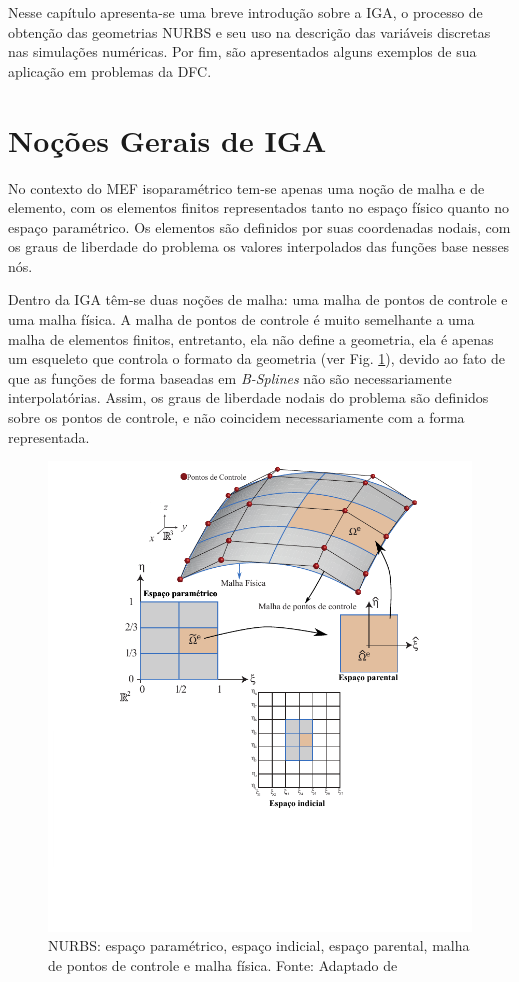 \documentclass[tese_patricia]{subfiles}
\begin{document}
Nesse capítulo apresenta-se uma breve introdução sobre a IGA, o processo de obtenção das geometrias NURBS e seu uso na descrição das variáveis discretas nas simulações numéricas. Por fim, são apresentados alguns exemplos de sua aplicação em problemas da DFC.

\vspace{-0.1cm}

\section{Noções Gerais de IGA}

No contexto do MEF isoparamétrico tem-se apenas uma noção de malha e de elemento, com os elementos finitos representados tanto no espaço físico quanto no espaço paramétrico. Os elementos são definidos por suas coordenadas nodais, com os graus de liberdade do problema os valores interpolados das funções base nesses nós.

Dentro da IGA têm-se duas noções de malha: uma malha de pontos de controle e uma malha física. A malha de pontos de controle é muito semelhante a uma malha de elementos finitos, entretanto, ela não define a geometria, ela é apenas um esqueleto que controla o formato da geometria (ver Fig. \ref{fig:espacos}), devido ao fato de que as funções de forma baseadas em \textit{B-Splines} não são necessariamente interpolatórias. Assim, os graus de liberdade nodais do problema são definidos sobre os pontos de controle, e não coincidem necessariamente com a forma representada.

\begin{figure}[htb!]
	\centering 
	\includegraphics[scale=1.0,trim=1cm 4cm 0cm 0cm, clip=true]{Imagens/Cap2/espacosNURBS.pdf}	
	\caption{NURBS: espaço paramétrico, espaço indicial, espaço parental, malha de pontos de controle e malha física. Fonte: Adaptado de }
	\label{fig:espacos}
\end{figure}
\end{document}
